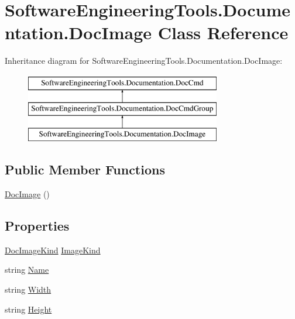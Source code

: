 \hypertarget{class_software_engineering_tools_1_1_documentation_1_1_doc_image}{\section{Software\+Engineering\+Tools.\+Documentation.\+Doc\+Image Class Reference}
\label{class_software_engineering_tools_1_1_documentation_1_1_doc_image}
}
Inheritance diagram for Software\+Engineering\+Tools.\+Documentation.\+Doc\+Image\+:\begin{figure}[H]
\begin{center}
\leavevmode
\includegraphics[height=3.000000cm]{class_software_engineering_tools_1_1_documentation_1_1_doc_image}
\end{center}
\end{figure}
\subsection*{Public Member Functions}
\begin{DoxyCompactItemize}
\item 
\hyperlink{class_software_engineering_tools_1_1_documentation_1_1_doc_image_abffb80615eb570220bd038dd88c93ffe}{Doc\+Image} ()
\end{DoxyCompactItemize}
\subsection*{Properties}
\begin{DoxyCompactItemize}
\item 
\hyperlink{namespace_software_engineering_tools_1_1_documentation_ab21398cff938858e1d9ebdc672403015}{Doc\+Image\+Kind} \hyperlink{class_software_engineering_tools_1_1_documentation_1_1_doc_image_aa73b29c8c230474bd80d01dfa25555ff}{Image\+Kind}
\item 
string \hyperlink{class_software_engineering_tools_1_1_documentation_1_1_doc_image_a18a4f96074d4dad07c0811896dd4305b}{Name}
\item 
string \hyperlink{class_software_engineering_tools_1_1_documentation_1_1_doc_image_a697f5c432b0a513b53dec61f66ad43ee}{Width}
\item 
string \hyperlink{class_software_engineering_tools_1_1_documentation_1_1_doc_image_a13b59f2f69ce4f465c966637480cef6c}{Height}
\end{DoxyCompactItemize}


